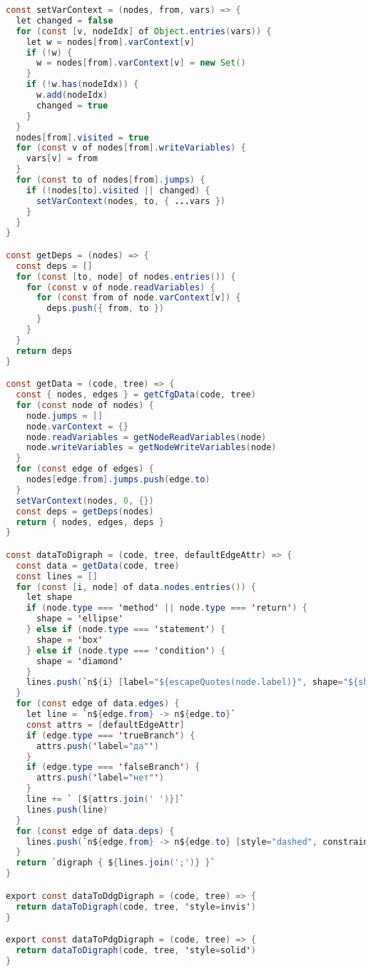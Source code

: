 \begin{lstlisting}[language=Java,
caption={ddg-pdg.js}]
const setVarContext = (nodes, from, vars) => {
  let changed = false
  for (const [v, nodeIdx] of Object.entries(vars)) {
    let w = nodes[from].varContext[v]
    if (!w) {
      w = nodes[from].varContext[v] = new Set()
    }
    if (!w.has(nodeIdx)) {
      w.add(nodeIdx)
      changed = true
    }
  }
  nodes[from].visited = true
  for (const v of nodes[from].writeVariables) {
    vars[v] = from
  }
  for (const to of nodes[from].jumps) {
    if (!nodes[to].visited || changed) {
      setVarContext(nodes, to, { ...vars })
    }
  }
}

const getDeps = (nodes) => {
  const deps = []
  for (const [to, node] of nodes.entries()) {
    for (const v of node.readVariables) {
      for (const from of node.varContext[v]) {
        deps.push({ from, to })
      }
    }
  }
  return deps
}

const getData = (code, tree) => {
  const { nodes, edges } = getCfgData(code, tree)
  for (const node of nodes) {
    node.jumps = []
    node.varContext = {}
    node.readVariables = getNodeReadVariables(node)
    node.writeVariables = getNodeWriteVariables(node)
  }
  for (const edge of edges) {
    nodes[edge.from].jumps.push(edge.to)
  }
  setVarContext(nodes, 0, {})
  const deps = getDeps(nodes)
  return { nodes, edges, deps }
}

const dataToDigraph = (code, tree, defaultEdgeAttr) => {
  const data = getData(code, tree)
  const lines = []
  for (const [i, node] of data.nodes.entries()) {
    let shape
    if (node.type === 'method' || node.type === 'return') {
      shape = 'ellipse'
    } else if (node.type === 'statement') {
      shape = 'box'
    } else if (node.type === 'condition') {
      shape = 'diamond'
    }
    lines.push(`n${i} [label="${escapeQuotes(node.label)}", shape="${shape}"]`)
  }
  for (const edge of data.edges) {
    let line = `n${edge.from} -> n${edge.to}`
    const attrs = [defaultEdgeAttr]
    if (edge.type === 'trueBranch') {
      attrs.push('label="да"')
    }
    if (edge.type === 'falseBranch') {
      attrs.push('label="нет"')
    }
    line += ` [${attrs.join(' ')}]`
    lines.push(line)
  }
  for (const edge of data.deps) {
    lines.push(`n${edge.from} -> n${edge.to} [style="dashed", constraint=false]`)
  }
  return `digraph { ${lines.join(';')} }`
}

export const dataToDdgDigraph = (code, tree) => {
  return dataToDigraph(code, tree, 'style=invis')
}

export const dataToPdgDigraph = (code, tree) => {
  return dataToDigraph(code, tree, 'style=solid')
}
\end{lstlisting}

